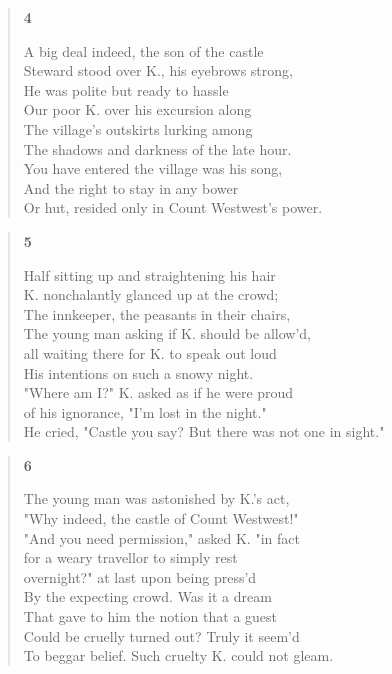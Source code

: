\documentclass{article}
\begin{document}
\begin{verse}
    \begin{center}
    \textbf{4} \\
  \end{center}
A big deal indeed, the son of the castle \\
Steward stood over K., his eyebrows strong, \\
He was polite but ready to hassle \\
Our poor K. over his excursion along \\
The village's outskirts lurking among \\
The shadows and darkness of the late hour. \\
You have entered the village was his song, \\
And the right to stay in any bower \\
Or hut, resided only in Count Westwest's power.
\end{verse}
\begin{verse}
    \begin{center}
    \textbf{5} \\
  \end{center}
Half sitting up and straightening his hair \\
K. nonchalantly glanced up at the crowd;  \\
The innkeeper, the peasants in their chairs,  \\
The young man asking if K. should be allow'd, \\
all waiting there for K. to speak out loud \\
His intentions on such a snowy night. \\
"Where am I?" K. asked as if he were proud \\
of his ignorance,  "I'm lost in the night." \\
He cried, "Castle you say? But there was not one in sight."
\end{verse}
\begin{verse}
  \begin{center}
    \textbf{6} \\
  \end{center}
  The young man was astonished by K.'s act, \\
  "Why indeed, the castle of Count Westwest!" \\
  "And you need permission," asked K. "in fact \\
  for a weary travellor to simply rest \\
  overnight?" at last upon being press'd \\
  By the expecting crowd. Was it a dream \\
  That gave to him the notion that a guest \\
  Could be cruelly turned out? Truly it seem'd \\
  To beggar belief. Such cruelty K. could not gleam.
\end{verse}
\end{document}
